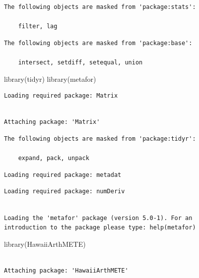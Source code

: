 \documentclass[
  letterpaper,
  DIV=11,
  numbers=noendperiod]{scrartcl}
\newenvironment{Shaded}{\begin{snugshade}}{\end{snugshade}}
\newcommand{\FunctionTok}[1]{\textcolor[rgb]{0.28,0.35,0.67}{#1}}
\newcommand{\NormalTok}[1]{\textcolor[rgb]{0.00,0.23,0.31}{#1}}
\begin{document}
\begin{verbatim}
The following objects are masked from 'package:stats':

    filter, lag
\end{verbatim}

\begin{verbatim}
The following objects are masked from 'package:base':

    intersect, setdiff, setequal, union
\end{verbatim}

\begin{Shaded}
\begin{Highlighting}[]
\FunctionTok{library}\NormalTok{(tidyr)}
\FunctionTok{library}\NormalTok{(metafor)}
\end{Highlighting}
\end{Shaded}

\begin{verbatim}
Loading required package: Matrix
\end{verbatim}

\begin{verbatim}

Attaching package: 'Matrix'
\end{verbatim}

\begin{verbatim}
The following objects are masked from 'package:tidyr':

    expand, pack, unpack
\end{verbatim}

\begin{verbatim}
Loading required package: metadat
\end{verbatim}

\begin{verbatim}
Loading required package: numDeriv
\end{verbatim}

\begin{verbatim}

Loading the 'metafor' package (version 5.0-1). For an
introduction to the package please type: help(metafor)
\end{verbatim}

\begin{Shaded}
\begin{Highlighting}[]
\FunctionTok{library}\NormalTok{(HawaiiArthMETE)}
\end{Highlighting}
\end{Shaded}

\begin{verbatim}

Attaching package: 'HawaiiArthMETE'
\end{verbatim}
\end{document}
